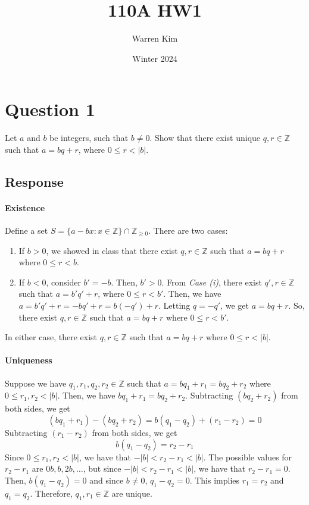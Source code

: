 \documentclass [12pt] {article}
\title{110A HW1}
\author{Warren Kim}
\date{Winter 2024}
\newcommand{\Z}{\mathbb{Z}}
\begin{document}
\maketitle

\section*{Question 1}
Let $a$ and $b$ be integers, such that $b \neq 0$. Show that there exist unique $q, r \in \Z$ such 
that $a = bq + r$, where $0 \leq r < |b|$. 

\subsection*{Response}
\paragraph{Existence}
Define a set $S = \{a - bx : x \in \Z\} \cap \Z_{\geq 0}$. There are two cases:
\begin{enumerate}[label=\textit{Case (\roman*):},leftmargin=*]
    \item If $b > 0$, we showed in class that there exist $q, r \in \Z$ such that $a = bq + r$
        where $0 \leq r < b$.
    \item If $b < 0$, consider $b' = -b$. Then, $b' > 0$. From \textit{Case (i)}, there exist 
        $q', r \in \Z$ such that $a = b'q' + r$, where $0 \leq r < b'$. Then, we have
        $a = b'q' + r = -bq' + r = b(-q') + r$. Letting $q = -q'$, we get $a = bq + r$. So, there 
        exist $q, r \in \Z$ such that $a = bq + r$ where $0 \leq r < b'$.
\end{enumerate}
In either case, there exist $q, r \in \Z$ such that $a = bq + r$ where $0 \leq r < |b|$.

\paragraph{Uniqueness}
Suppose we have $q_1, r_1, q_2, r_2 \in \Z$ such that $a = bq_1 + r_1 = bq_2 + r_2$ where 
$0 \leq r_1, r_2 < |b|$. Then, we have $bq_1 + r_1 = bq_2 + r_2$. Subtracting $(bq_2 + r_2)$ from 
both sides, we get
\[(bq_1 + r_1) - (bq_2 + r_2) = b(q_1 - q_2) + (r_1 - r_2) = 0\]
Subtracting $(r_1 - r_2)$ from both sides, we get
\[b(q_1 - q_2) = r_2 - r_1\]
Since $0 \leq r_1, r_2 < |b|$, we have that $-|b| < r_2 - r_1 < |b|$. The possible values for
$r_2 - r_1$ are $0b, b, 2b, \ldots$, but since $-|b| < r_2 - r_1 < |b|$, we have that
$r_2 - r_1 = 0$. Then, $b(q_1 - q_2) = 0$ and since $b \neq 0$, $q_1 - q_2 = 0$. This implies
$r_1 = r_2$ and $q_1 = q_2$. Therefore, $q_1, r_1 \in \Z$ are unique.
\newpage
\end{document}

